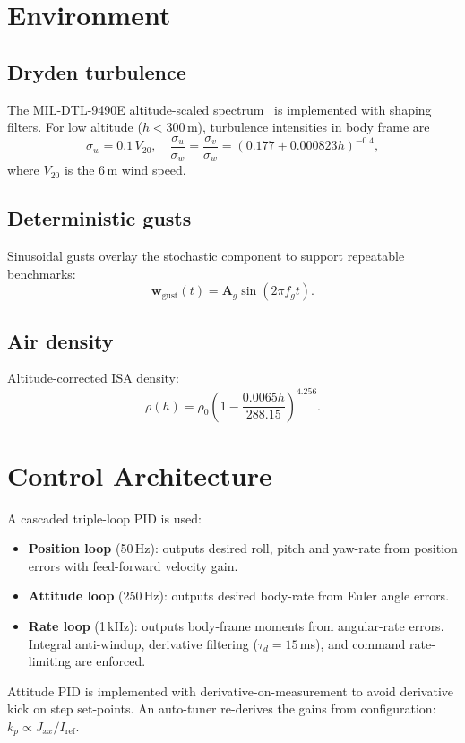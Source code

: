 \documentclass[a4paper, conference]{IEEEtran}
\begin{document}
\section{Environment}\label{sec:env}
\subsection{Dryden turbulence}
The MIL-DTL-9490E altitude-scaled spectrum~\cite{dryden} is implemented with
shaping filters. For low altitude ($h<300$\,m), turbulence intensities
in body frame are
\begin{equation}
\sigma_w = 0.1\,V_{20},\quad
\frac{\sigma_u}{\sigma_w}=\frac{\sigma_v}{\sigma_w} = \left(0.177+0.000823 h\right)^{-0.4},
\end{equation}
where $V_{20}$ is the 6\,m wind speed.

\subsection{Deterministic gusts}
Sinusoidal gusts overlay the stochastic component to support
repeatable benchmarks:
\begin{equation}
\mathbf{w}_{\text{gust}}(t) = \mathbf{A}_g \sin(2\pi f_g t).
\end{equation}

\subsection{Air density}
Altitude-corrected ISA density:
\begin{equation}
\rho(h) = \rho_0 \left(1-\frac{0.0065 h}{288.15}\right)^{4.256}.
\end{equation}

\section{Control Architecture}\label{sec:control}
A cascaded triple-loop PID is used:
\begin{itemize}
\item \textbf{Position loop} (50\,Hz): outputs desired roll, pitch and
      yaw-rate from position errors with feed-forward velocity gain.
\item \textbf{Attitude loop} (250\,Hz): outputs desired body-rate
      from Euler angle errors.
\item \textbf{Rate loop} (1\,kHz): outputs body-frame moments from
      angular-rate errors. Integral anti-windup, derivative filtering
      ($\tau_d=15$\,ms), and command rate-limiting are enforced.
\end{itemize}
Attitude PID is implemented with derivative-on-measurement to avoid
derivative kick on step set-points. An auto-tuner re-derives the gains
from configuration: $k_p \propto J_{xx}/I_{\mathrm{ref}}$.
\end{document}
